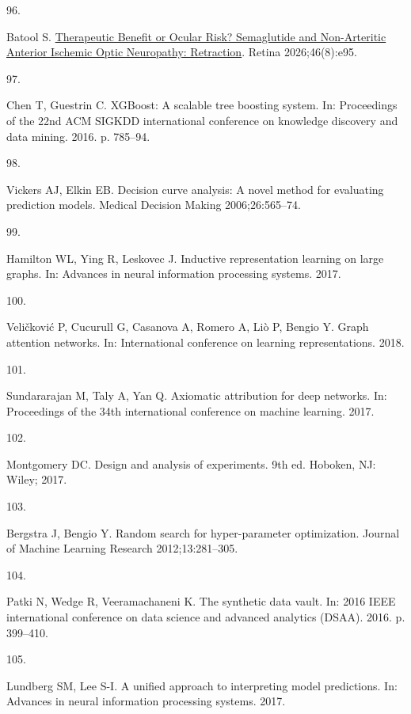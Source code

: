 \documentclass[
  11pt,
]{article}
\newlength{\cslhangindent}
\newlength{\csllabelwidth}
\newenvironment{CSLReferences}[2] %
 {\begin{list}{}{%
  \setlength{\itemindent}{0pt}
  \setlength{\leftmargin}{0pt}
  \setlength{\parsep}{0pt}
  \ifodd #1
   \setlength{\leftmargin}{\cslhangindent}
   \setlength{\itemindent}{-1\cslhangindent}
  \fi
  \setlength{\itemsep}{#2\baselineskip}}}
 {\end{list}}
\newcommand{\CSLLeftMargin}[1]{\parbox[t]{\csllabelwidth}{\strut#1\strut}}
\newcommand{\CSLRightInline}[1]{\parbox[t]{\linewidth - \csllabelwidth}{\strut#1\strut}}
\begin{document}
\begin{CSLReferences}{0}{1}
\CSLLeftMargin{96. }%
\CSLRightInline{Batool S.
\href{https://doi.org/10.1097/IAE.0000000000004884}{{Therapeutic Benefit
or Ocular Risk? Semaglutide and Non-Arteritic Anterior Ischemic Optic
Neuropathy: Retraction}}. Retina 2026;46(8):e95. }

\CSLLeftMargin{97. }%
\CSLRightInline{Chen T, Guestrin C. XGBoost: A scalable tree boosting
system. In: Proceedings of the 22nd ACM SIGKDD international conference
on knowledge discovery and data mining. 2016. p. 785--94.}

\CSLLeftMargin{98. }%
\CSLRightInline{Vickers AJ, Elkin EB. Decision curve analysis: A novel
method for evaluating prediction models. Medical Decision Making
2006;26:565--74. }

\CSLLeftMargin{99. }%
\CSLRightInline{Hamilton WL, Ying R, Leskovec J. Inductive
representation learning on large graphs. In: Advances in neural
information processing systems. 2017. }

\CSLLeftMargin{100. }%
\CSLRightInline{Veličković P, Cucurull G, Casanova A, Romero A, Liò P,
Bengio Y. Graph attention networks. In: International conference on
learning representations. 2018. }

\CSLLeftMargin{101. }%
\CSLRightInline{Sundararajan M, Taly A, Yan Q. Axiomatic attribution for
deep networks. In: Proceedings of the 34th international conference on
machine learning. 2017. }

\CSLLeftMargin{102. }%
\CSLRightInline{Montgomery DC. Design and analysis of experiments. 9th
ed. Hoboken, NJ: Wiley; 2017. }

\CSLLeftMargin{103. }%
\CSLRightInline{Bergstra J, Bengio Y. Random search for hyper-parameter
optimization. Journal of Machine Learning Research 2012;13:281--305. }

\CSLLeftMargin{104. }%
\CSLRightInline{Patki N, Wedge R, Veeramachaneni K. The synthetic data
vault. In: 2016 IEEE international conference on data science and
advanced analytics (DSAA). 2016. p. 399--410.}

\CSLLeftMargin{105. }%
\CSLRightInline{Lundberg SM, Lee S-I. A unified approach to interpreting
model predictions. In: Advances in neural information processing
systems. 2017. }


\end{CSLReferences}
\end{document}
